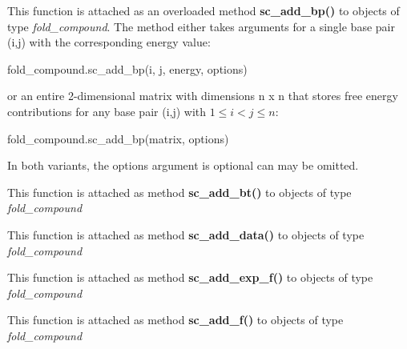 \begin{DoxyRefList}
This function is attached as an overloaded method {\bfseries sc\+\_\+add\+\_\+bp()} to objects of type {\itshape fold\+\_\+compound}. The method either takes arguments for a single base pair (i,j) with the corresponding energy value\+: 
\begin{DoxyCode}
fold\_compound.sc\_add\_bp(i, j, energy, options)
\end{DoxyCode}
 or an entire 2-\/dimensional matrix with dimensions n x n that stores free energy contributions for any base pair (i,j) with $ 1 \leq i < j \leq n $\+: 
\begin{DoxyCode}
fold\_compound.sc\_add\_bp(matrix, options)
\end{DoxyCode}
 In both variants, the {\ttfamily options} argument is optional can may be omitted.  
\item[\label{wrappers__wrappers000020}%
\Hypertarget{wrappers__wrappers000020}%
Global \mbox{\hyperlink{group__soft__constraints_gabde7d07a79bb9a8f4721aee247b674ea}{vrna\+\_\+sc\+\_\+add\+\_\+bt}} (vrna\+\_\+fold\+\_\+compound\+\_\+t $\ast$vc, vrna\+\_\+callback\+\_\+sc\+\_\+backtrack $\ast$f)]This function is attached as method {\bfseries sc\+\_\+add\+\_\+bt()} to objects of type {\itshape fold\+\_\+compound}  
\item[\label{wrappers__wrappers000018}%
\Hypertarget{wrappers__wrappers000018}%
Global \mbox{\hyperlink{group__soft__constraints_ga15c6d52471ec97897e2bb7f964f5deb6}{vrna\+\_\+sc\+\_\+add\+\_\+data}} (vrna\+\_\+fold\+\_\+compound\+\_\+t $\ast$vc, void $\ast$data, vrna\+\_\+callback\+\_\+free\+\_\+auxdata $\ast$free\+\_\+data)]This function is attached as method {\bfseries sc\+\_\+add\+\_\+data()} to objects of type {\itshape fold\+\_\+compound}  
\item[\label{wrappers__wrappers000021}%
\Hypertarget{wrappers__wrappers000021}%
Global \mbox{\hyperlink{group__soft__constraints_ga87e382b5d0c9b7d9ce1b79c0473ff700}{vrna\+\_\+sc\+\_\+add\+\_\+exp\+\_\+f}} (vrna\+\_\+fold\+\_\+compound\+\_\+t $\ast$vc, vrna\+\_\+callback\+\_\+sc\+\_\+exp\+\_\+energy $\ast$exp\+\_\+f)]This function is attached as method {\bfseries sc\+\_\+add\+\_\+exp\+\_\+f()} to objects of type {\itshape fold\+\_\+compound}  
\item[\label{wrappers__wrappers000019}%
\Hypertarget{wrappers__wrappers000019}%
Global \mbox{\hyperlink{group__soft__constraints_ga8c7d907ec0125cd61c04e0908010a4e9}{vrna\+\_\+sc\+\_\+add\+\_\+f}} (vrna\+\_\+fold\+\_\+compound\+\_\+t $\ast$vc, vrna\+\_\+callback\+\_\+sc\+\_\+energy $\ast$f)]This function is attached as method {\bfseries sc\+\_\+add\+\_\+f()} to objects of type {\itshape fold\+\_\+compound}  

\end{DoxyRefList}
